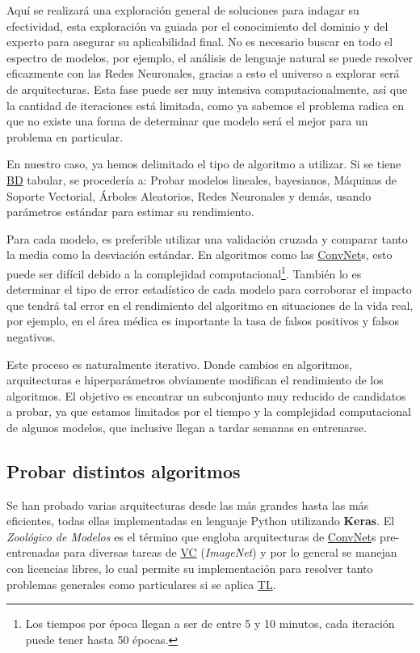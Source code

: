 
Aquí se realizará una exploración general de soluciones para indagar su
efectividad, esta exploración va guiada por el conocimiento del dominio y del
experto para asegurar su aplicabilidad final. No es necesario buscar en todo el
espectro de modelos, por ejemplo, el análisis de lenguaje natural se puede
resolver eficazmente con las Redes Neuronales,  gracias a esto el universo a
explorar será de arquitecturas. Esta fase puede ser muy intensiva
computacionalmente, así que la cantidad de iteraciones está limitada, como ya
sabemos el problema radica en que no existe una forma de determinar que modelo
será el mejor para un problema en particular.

En nuestro caso, ya hemos delimitado el tipo de algoritmo a utilizar. Si se
tiene \hyperlink{abbr}{BD} tabular, se procedería a: Probar modelos lineales,
bayesianos, Máquinas de Soporte Vectorial, Árboles Aleatorios, Redes Neuronales
y demás, usando parámetros estándar para estimar su rendimiento.

Para cada modelo, es preferible utilizar una validación cruzada y comparar tanto
la media como la desviación estándar. En algoritmos como las
\hyperlink{abbr}{ConvNet}s, esto puede ser difícil debido a la complejidad
computacional\footnote{Los tiempos por época llegan a ser de entre 5 y 10
minutos, cada iteración puede tener hasta 50 épocas.}. También lo es determinar
el tipo de error estadístico de cada modelo para corroborar el impacto que
tendrá tal error en el rendimiento del algoritmo en situaciones de la vida real,
por ejemplo, en el área médica es importante la tasa de falsos positivos y
falsos negativos.

Este proceso es naturalmente iterativo. Donde cambios en algoritmos,
arquitecturas e hiperparámetros obviamente modifican el rendimiento de los
algoritmos. El objetivo es encontrar un subconjunto muy reducido de candidatos a
probar, ya que estamos limitados por el tiempo y la complejidad computacional de
algunos modelos, que inclusive llegan a tardar semanas en entrenarse.

\subsection{Probar distintos algoritmos}

Se han probado varias arquitecturas desde las más grandes hasta las más
eficientes, todas ellas implementadas en lenguaje Python utilizando
\textbf{Keras}. El \emph{Zoológico de Modelos} es el término que engloba
arquitecturas de \hyperlink{abbr}{ConvNet}s pre-entrenadas para diversas tareas
de \hyperlink{abbr}{VC} (\emph{ImageNet}) y por lo general se manejan con
licencias libres, lo cual permite su implementación para resolver tanto
problemas generales como particulares si se aplica \hyperlink{abbr}{TL}.

